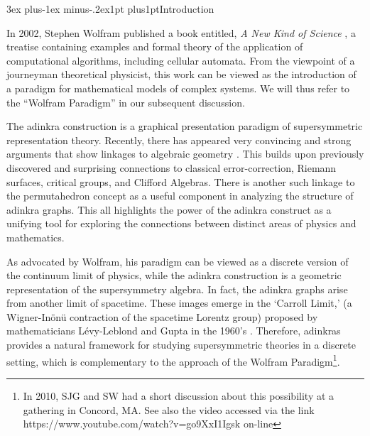 \documentclass[12pt]{article}
\makeatletter
\def\section{\@startsection{section}{1}{\z@}
        {3ex plus-1ex minus-.2ex}{1pt plus1pt}{\large\sf\bfseries\boldmath}}
\makeatother
\begin{document}
%
\tableofcontents
\newpage
\section{Introduction}

In 2002, Stephen Wolfram published a book entitled, {\it {A New Kind of
Science}} \cite{18}, a treatise containing examples and formal theory of the application of computational algorithms, including cellular automata.  From the viewpoint of a
journeyman theoretical physicist, this work can be viewed as the introduction of
a paradigm for mathematical models of complex systems.  We will thus refer to the
``Wolfram Paradigm'' in our subsequent discussion.

The adinkra construction \cite{Adnk1} is a graphical presentation paradigm of supersymmetric representation theory. Recently, there has
appeared very convincing and strong arguments that show  linkages to algebraic geometry
\cite{Reager}. This builds upon previously discovered and surprising connections to
classical error-correction\cite{codes1,codes2,codes3}, Riemann surfaces\cite{GEO1,GEO2,MON},
critical groups\cite{IIGn}, and Clifford Algebras\cite{CLIFF}.
There is another such linkage to the permutahedron concept\cite{pHR0n1,pHR0n2,pHR0n3,pHR0n4} as a useful component \cite{Adnk300}
in analyzing the structure of adinkra graphs.
This all highlights the power of the 
adinkra construct as a unifying tool for exploring the connections between distinct areas of physics and 
mathematics.

As advocated by Wolfram, his paradigm can be viewed as a discrete version of the continuum limit of physics, while the adinkra construction is a geometric representation of the supersymmetry algebra. In fact, the adinkra graphs arise from another limit of spacetime. These images emerge in the `Carroll Limit,' (a Wigner-In\" on\"u contraction of the spacetime Lorentz group) proposed by mathematicians L\'evy-Leblond and Gupta in the 1960's \cite{CARR1,CARR2}.  Therefore, adinkras provides a natural framework for studying supersymmetric theories in a discrete setting, which is complementary to the approach of the Wolfram Paradigm\footnote{In 2010, SJG and SW had a short discussion about
this possibility at a gathering in Concord, MA.  See also the video accessed via the link
https://www.youtube.com/watch?v=go9XxI1Igsk on-line}.
\end{document}
